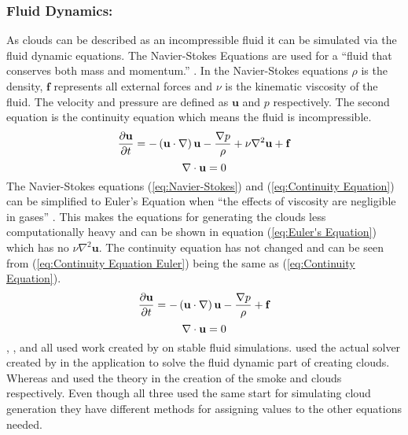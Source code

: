 \subsubsection{Fluid Dynamics:}
\label{sec:fd}
As clouds can be described as an incompressible fluid it can be simulated via the fluid dynamic equations.
The Navier-Stokes Equations are used for a “fluid that conserves both mass and momentum.” \citep{JStam99}.
In the Navier-Stokes equations $\rho$ is the density, $\mathbf{f}$ represents all external forces and $\nu$ is the kinematic viscosity of the fluid.
The velocity and pressure are defined as $\mathbf{u}$ and $p$ respectively.
The second equation is the continuity equation which means the fluid is incompressible.
\begin{equation} \label{eq:Navier-Stokes}
  \centering
  \frac{\partial \mathbf{u}}{\partial t}=-\left(\mathbf{u}\cdot \nabla \right)\mathbf{u}-\frac{\nabla p}{\rho}+\nu{\nabla }^{2}\mathbf{u}+\mathbf{f}
\end{equation}
\begin{equation} \label{eq:Continuity Equation}
  \centering
  \nabla\cdot\mathbf{u}=0
\end{equation}
The Navier-Stokes equations (\ref{eq:Navier-Stokes}) and (\ref{eq:Continuity Equation}) can be simplified to Euler's Equation when “the effects of viscosity are negligible in gases” \citep*{Fedkiw01}.
This makes the equations for generating the clouds less computationally heavy and can be shown in equation (\ref{eq:Euler's Equation}) which has no $\nu{\nabla }^{2}\mathbf{u}$.
The continuity equation has not changed and can be seen from (\ref{eq:Continuity Equation Euler}) being the same as (\ref{eq:Continuity Equation}).
\begin{equation} \label{eq:Euler's Equation}
  \centering
   \frac{\partial \mathbf{u}}{\partial t}=-\left(\mathbf{u}\cdot \nabla \right)\mathbf{u}-\frac{\nabla p}{\rho}+\mathbf{f}
\end{equation}
\begin{equation} \label{eq:Continuity Equation Euler}
  \centering
  \nabla\cdot\mathbf{u}=0
\end{equation}
\citet*{Fedkiw01}, \citet{HarrisEtAl03}, and \citet*{DOverby02} all used work created by \citet{JStam99} on stable fluid simulations.
\citet*{DOverby02} used the actual solver created by \citet{JStam99} in the application to solve the fluid dynamic part of creating clouds.
Whereas \citet*{Fedkiw01} and \citet{HarrisEtAl03} used the theory in the creation of the smoke and clouds respectively.
Even though all three used the same start for simulating cloud generation they have different methods for assigning values to the other equations needed. 


